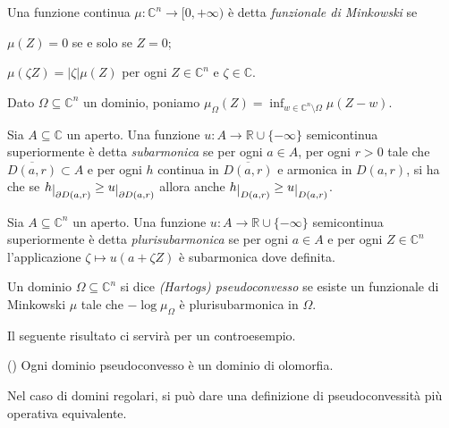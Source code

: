 \begin{defn}
    Una funzione continua $\mu:\mathbb{C}^n \longrightarrow [0,+\infty)$ è detta \textit{funzionale di Minkowski} se
    \begin{nlist}
        \item $\mu(Z)=0$ se e solo se $Z=0$;
        \item $\mu(\zeta Z)=|\zeta|\mu(Z)$ per ogni $Z \in \mathbb{C}^n$ e $\zeta\in\mathbb{C}$.
    \end{nlist}
    Dato $\Omega\subseteq\mathbb{C}^n$ un dominio, poniamo $\mu_{\Omega}(Z)=\displaystyle\inf_{w\in\mathbb{C}^n\setminus\Omega}\mu(Z-w)$.
\end{defn}

\begin{defn} \label{psh}
    Sia $A\subseteq\mathbb{C}$ un aperto. Una funzione $u:A \longrightarrow \mathbb{R}\cup\{-\infty\}$ semicontinua superiormente è detta \textit{subarmonica} se per ogni $a \in A$, per ogni $r>0$ tale che $\overline{D(a,r)} \subset A$ e per ogni $h$ continua in $\overline{D(a,r)}$ e armonica in $D(a,r)$, si ha che se $h\restrict{\partial D(a,r)} \ge u\restrict{\partial D(a,r)}$ allora anche $h\restrict{D(a,r)} \ge u \restrict{D(a,r)}$.

    Sia $A\subseteq\mathbb{C}^n$ un aperto. Una funzione $u:A \longrightarrow \mathbb{R}\cup\{-\infty\}$ semicontinua superiormente è detta \textit{plurisubarmonica} se per ogni $a \in A$ e per ogni $Z \in \mathbb{C}^n$ l'applicazione $\zeta \longmapsto u(a+\zeta Z)$ è subarmonica dove definita.
\end{defn}

\begin{defn}
    Un dominio $\Omega \subseteq \mathbb{C}^n$ si dice \textit{(Hartogs) pseudoconvesso} se esiste un funzionale di Minkowski $\mu$ tale che $-\log\mu_{\Omega}$ è plurisubarmonica in $\Omega$.
\end{defn}

 Il seguente risultato ci servirà per un controesempio.

 \begin{thm}
    (\cite[Theorem 5.1.2]{Kr}) Ogni dominio pseudoconvesso è un dominio di olomorfia.
 \end{thm}

Nel caso di domini regolari, si può dare una definizione di pseudoconvessità più operativa equivalente.

